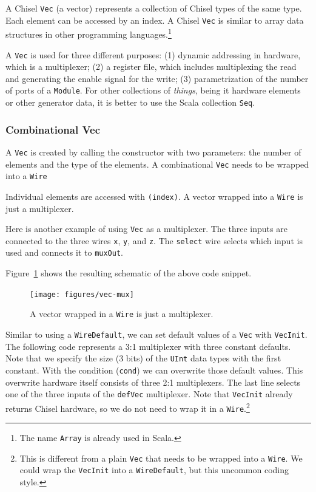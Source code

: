 \documentclass[%
    10pt,
    headinclude, footexclude,
    openright, %
    notitlepage,
    cleardoubleempty,
    headsepline,
    pointlessnumbers,
    bibtotoc, idxtotoc,
    ]{scrbook}
\newcommand{\code}[1]{{\lstinline[basicstyle=\small\ttfamily]{#1}}}
\newcommand{\codefoot}[1]{{\lstinline[basicstyle=\footnotesize\ttfamily]{#1}}}
\begin{document}
A Chisel \code{Vec} (a vector) represents a collection of Chisel types of the same type.
Each element can be accessed by an index. A Chisel \code{Vec} is similar
to array data structures in other programming languages.\footnote{The name \codefoot{Array}
is already used in Scala.}

A \code{Vec} is used for three different purposes: (1) dynamic addressing in hardware,
which is a multiplexer; (2) a register file, which includes multiplexing the read and
generating the enable signal for the write; (3) parametrization of the number of
ports of a \code{Module}. For other collections of \emph{things}, being it hardware elements
or other generator data, it is better to use the Scala collection \code{Seq}.

\subsubsection{Combinational Vec}


A \code{Vec} is created by calling the constructor with two parameters: the
number of elements and the type of the elements. A combinational \code{Vec}
needs to be wrapped into a \code{Wire}


\noindent Individual elements are accessed with \code{(index)}.
A vector wrapped into a \code{Wire} is just a multiplexer.


Here is another example of using \code{Vec} as a multiplexer.
The three inputs are connected to the three wires \code{x}, \code{y},
and \code{z}. The \code{select} wire selects which input is used and
connects it to \code{muxOut}.


\noindent Figure~\ref{fig:vec-mux} shows the resulting schematic of the above code snippet.

\begin{figure}
  \centering
  \texttt{[image: figures/vec-mux]}
  \caption{A vector wrapped in a \code{Wire} is just a multiplexer.}
  \label{fig:vec-mux}
\end{figure}

Similar to using a \code{WireDefault}, we can set default values of a \code{Vec} with \code{VecInit}.
The following code represents a 3:1 multiplexer with three constant defaults. Note that we specify
the size (3 bits) of the \code{UInt} data types with the first constant.
With the condition (\code{cond}) we can overwrite those default values.
This overwrite hardware itself consists of three 2:1 multiplexers. The last line selects
one of the three inputs of the \code{defVec} multiplexer. Note that \code{VecInit} already returns
Chisel hardware, so we do not need to wrap it in a \code{Wire}.\footnote{This is different from
a plain \codefoot{Vec} that needs to be wrapped into a \codefoot{Wire}. We could wrap the \codefoot{VecInit}
into a \codefoot{WireDefault}, but this uncommon coding style.}
\end{document}
